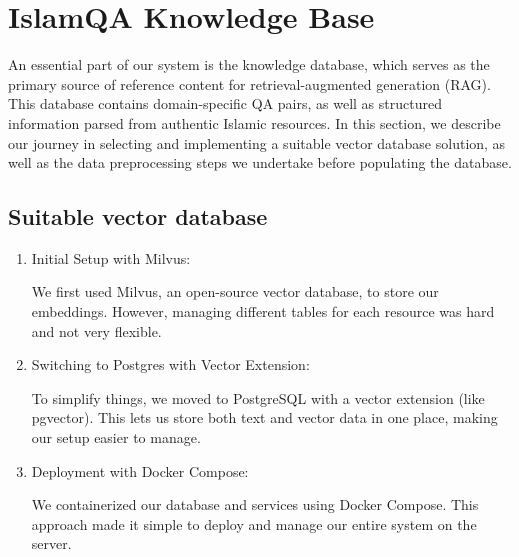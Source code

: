 \section{IslamQA Knowledge Base}
An essential part of our system is the knowledge database, which serves as the primary source of reference content for retrieval-augmented generation (RAG). This database contains domain-specific QA pairs, as well as structured information parsed from authentic Islamic resources. In this section, we describe our journey in selecting and implementing a suitable vector database solution, as well as the data preprocessing steps we undertake before populating the database.
\subsection{Suitable vector database}
\begin{enumerate}
    \item Initial Setup with Milvus:
    
    We first used Milvus, an open-source vector database, to store our embeddings. However, managing different tables for each resource was hard and not very flexible.

    \item Switching to Postgres with Vector Extension:
    
    To simplify things, we moved to PostgreSQL with a vector extension (like pgvector). This lets us store both text and vector data in one place, making our setup easier to manage.

    \item Deployment with Docker Compose:
    
    We containerized our database and services using Docker Compose. This approach made it simple to deploy and manage our entire system on the server.
\end{enumerate}

